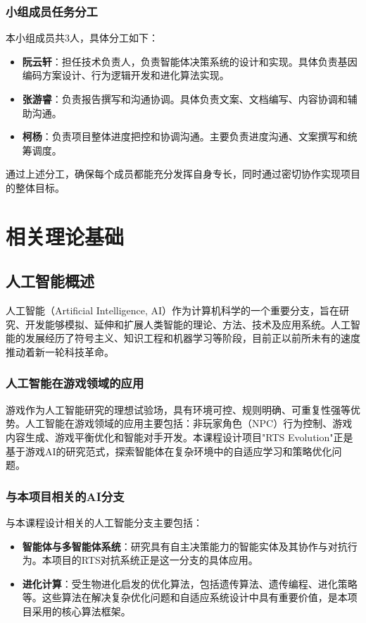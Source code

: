 \documentclass[12pt,a4paper]{article}
\begin{document}
	\subsubsection{小组成员任务分工}
	本小组成员共3人，具体分工如下：
	\begin{itemize}
		\item \textbf{阮云轩}：担任技术负责人，负责智能体决策系统的设计和实现。具体负责基因编码方案设计、行为逻辑开发和进化算法实现。
		\item \textbf{张游睿}：负责报告撰写和沟通协调。具体负责文案、文档编写、内容协调和辅助沟通。
		\item \textbf{柯杨}：负责项目整体进度把控和协调沟通。主要负责进度沟通、文案撰写和统筹调度。
	\end{itemize}
	
	通过上述分工，确保每个成员都能充分发挥自身专长，同时通过密切协作实现项目的整体目标。
	\newpage
	
	\section{相关理论基础}
	
	\subsection{人工智能概述}
	人工智能（Artificial Intelligence, AI）作为计算机科学的一个重要分支，旨在研究、开发能够模拟、延伸和扩展人类智能的理论、方法、技术及应用系统。人工智能的发展经历了符号主义、知识工程和机器学习等阶段，目前正以前所未有的速度推动着新一轮科技革命。
	
	\subsubsection{人工智能在游戏领域的应用}
	游戏作为人工智能研究的理想试验场，具有环境可控、规则明确、可重复性强等优势。人工智能在游戏领域的应用主要包括：非玩家角色（NPC）行为控制、游戏内容生成、游戏平衡优化和智能对手开发。本课程设计项目"RTS Evolution"正是基于游戏AI的研究范式，探索智能体在复杂环境中的自适应学习和策略优化问题。
	
	\subsubsection{与本项目相关的AI分支}
	与本课程设计相关的人工智能分支主要包括：
	\begin{itemize}
		\item \textbf{智能体与多智能体系统}：研究具有自主决策能力的智能实体及其协作与对抗行为。本项目的RTS对抗系统正是这一分支的具体应用。
		
		\item \textbf{进化计算}：受生物进化启发的优化算法，包括遗传算法、遗传编程、进化策略等。这些算法在解决复杂优化问题和自适应系统设计中具有重要价值，是本项目采用的核心算法框架。
	\end{itemize}
	
\end{document}
